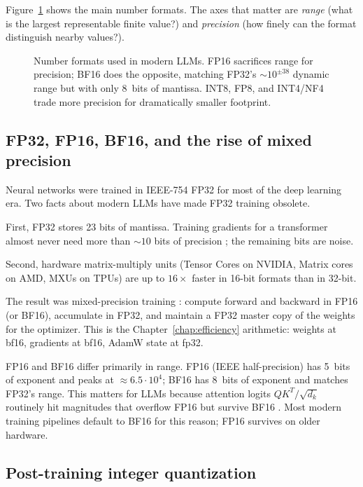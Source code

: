 Figure~\ref{fig:quantization-precision} shows the main number
formats. The axes that matter are \emph{range} (what is the largest
representable finite value?) and \emph{precision} (how finely can
the format distinguish nearby values?).

\begin{figure}[ht]
  \centering
  
  \caption{Number formats used in modern LLMs. FP16 sacrifices range
  for precision; BF16 does the opposite, matching FP32's
  $\sim 10^{\pm 38}$ dynamic range but with only 8~bits of mantissa.
  INT8, FP8, and INT4/NF4 trade more precision for dramatically
  smaller footprint.}
  \label{fig:quantization-precision}
\end{figure}

\subsection{FP32, FP16, BF16, and the rise of mixed precision}

Neural networks were trained in IEEE-754 FP32 for most of the deep
learning era. Two facts about modern LLMs have made FP32 training
obsolete.

First, FP32 stores 23 bits of mantissa. Training gradients for a
transformer almost never need more than $\sim 10$ bits of precision
\citep{micikevicius2018mixed}; the remaining bits are noise.

Second, hardware matrix-multiply units (Tensor Cores on NVIDIA,
Matrix cores on AMD, MXUs on TPUs) are up to $16\times$ faster in
16-bit formats than in 32-bit.

The result was mixed-precision training
\citep{micikevicius2018mixed}: compute forward and backward in FP16
(or BF16), accumulate in FP32, and maintain a FP32 master copy of the
weights for the optimizer. This is the Chapter~\ref{chap:efficiency} arithmetic: weights at
bf16, gradients at bf16, AdamW state at fp32.

FP16 and BF16 differ primarily in range. FP16 (IEEE half-precision)
has 5~bits of exponent and peaks at $\approx 6.5\cdot 10^4$; BF16
has 8~bits of exponent and matches FP32's range. This matters for
LLMs because attention logits $QK^T / \sqrt{d_k}$ routinely hit
magnitudes that overflow FP16 but survive BF16
\citep{kalamkar2019bfloat16}. Most modern training pipelines default
to BF16 for this reason; FP16 survives on older hardware.

\subsection{Post-training integer quantization}

